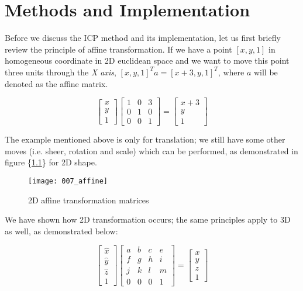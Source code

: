 \documentclass[../structure.tex]{subfiles}
\begin{document}
\chapter{Methods and Implementation}
\hspace{2em}Before we discuss the ICP method and its implementation, let us first briefly review the principle of affine transformation. If we have a point $[x,y,1]$ in homogeneous coordinate in 2D euclidean space and we want to move this point three units through the \textit{X axis}, $[x,y,1]^T a = [x+3,y,1]^T$, where $a$ will be  denoted as the affine matrix.

\begin{equation*}
\begin{bmatrix}
x \\ y \\ 1
\end{bmatrix}
\begin{bmatrix}
1 & 0 & 3 \\
0 & 1 & 0 \\
0 & 0 & 1
\end{bmatrix}
=
\begin{bmatrix}
x + 3 \\ y \\ 1
\end{bmatrix}
\end{equation*}

The example mentioned above is only for translation; we still have some other moves (i.e. sheer, rotation and scale) which can be performed, as demonstrated in figure \{\ref{fig:affine}\} for 2D shape.

\begin{figure}[h!]
\centering
\texttt{[image: 007\_affine]}
\captionsetup{justification=centering}
\caption{2D affine transformation matrices \cite{Wikipedia2016}}
\label{fig:affine}
\end{figure}

We have shown how 2D transformation occurs; the same principles apply to 3D as well, as demonstrated below:

\begin{equation*}
\begin{bmatrix}
\hat{x} \\ \hat{y} \\ \hat{z} \\ 1
\end{bmatrix}
\begin{bmatrix}
a & b & c & e\\
f & g & h & i\\
j & k & l & m\\
0 & 0 & 0 & 1
\end{bmatrix}
=
\begin{bmatrix}
x \\ y \\ z \\ 1
\end{bmatrix}
\end{equation*}
\end{document}
